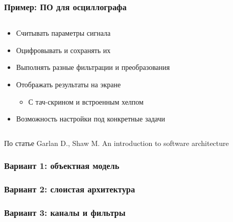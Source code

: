 \documentclass{../cscslides}
\begin{document}
    \begin{frame}
        \frametitle{Пример: ПО для осциллографа}
        \begin{columns}
            \begin{column}{0.6\textwidth}
                \begin{itemize}
                    \item Считывать параметры сигнала
                    \item Оцифровывать и сохранять их
                    \item Выполнять разные фильтрации и преобразования
                    \item Отображать результаты на экране
                    \begin{itemize}
                        \item С тач-скрином и встроенным хелпом
                    \end{itemize}
                    \item Возможность настройки под конкретные задачи
                \end{itemize}
            \end{column}
            \begin{column}{0.4\textwidth}
            \end{column}
        \end{columns}
        \vspace{1cm}
        \begin{tiny}
            По статье Garlan D., Shaw M. An introduction to software architecture
        \end{tiny}
    \end{frame}

    \begin{frame}
        \frametitle{Вариант 1: объектная модель}
    \end{frame}

    \begin{frame}
        \frametitle{Вариант 2: слоистая архитектура}
    \end{frame}

    \begin{frame}
        \frametitle{Вариант 3: каналы и фильтры}
    \end{frame}
\end{document}
